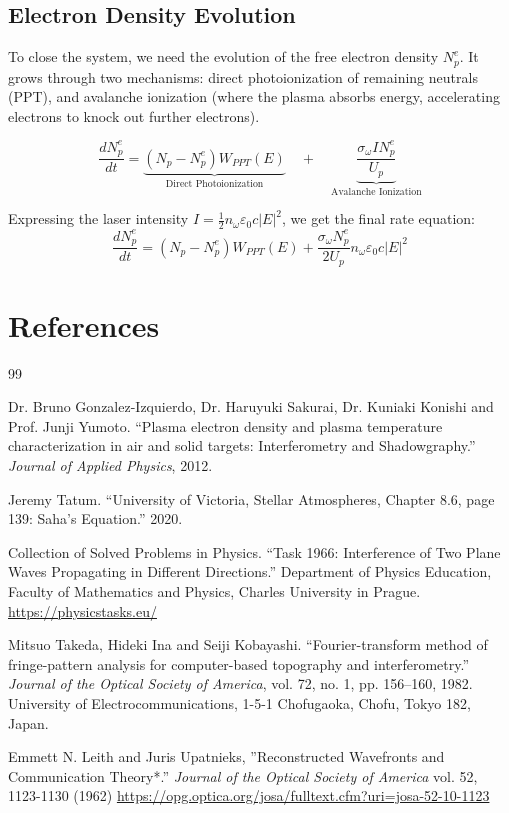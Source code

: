 \documentclass[11pt,a4paper]{article}
\begin{document}
\subsection*{Electron Density Evolution}
To close the system, we need the evolution of the free electron density $N_p^e$. It grows through two mechanisms: direct photoionization of remaining neutrals (PPT), and avalanche ionization (where the plasma absorbs energy, accelerating electrons to knock out further electrons).

\begin{equation}
\frac{d N_p^e}{dt} = \underbrace{(N_p - N_p^e) W_{PPT}(E)}_{\text{Direct Photoionization}} \quad + \quad \underbrace{\frac{\sigma_{\omega} I N_p^e}{U_p}}_{\text{Avalanche Ionization}}
\end{equation}

Expressing the laser intensity $I = \frac{1}{2} n_{\omega} \varepsilon_0 c |E|^2$, we get the final rate equation:
\begin{equation}
\frac{d N_p^e}{dt} = (N_p - N_p^e) W_{PPT}(E) + \frac{\sigma_{\omega} N_p^e}{2 U_p} n_{\omega} \varepsilon_0 c |E|^2
\end{equation}
\section{References}

\begin{thebibliography}{99}

Dr. Bruno Gonzalez-Izquierdo, Dr. Haruyuki Sakurai, Dr. Kuniaki Konishi and Prof. Junji Yumoto. 
``Plasma electron density and plasma temperature characterization in air and solid targets: Interferometry and Shadowgraphy.'' 
\textit{Journal of Applied Physics}, 2012.

Jeremy Tatum. 
``University of Victoria, Stellar Atmospheres, Chapter 8.6, page 139: Saha's Equation.''
2020.

Collection of Solved Problems in Physics. 
``Task 1966: Interference of Two Plane Waves Propagating in Different Directions.'' 
Department of Physics Education, Faculty of Mathematics and Physics, Charles University in Prague.
\newline
\url{https://physicstasks.eu/}

Mitsuo Takeda, Hideki Ina and Seiji Kobayashi. 
``Fourier-transform method of fringe-pattern analysis for computer-based topography and interferometry.'' 
\textit{Journal of the Optical Society of America}, vol. 72, no. 1, pp. 156--160, 1982.
\newline
University of Electrocommunications, 1-5-1 Chofugaoka, Chofu, Tokyo 182, Japan.

Emmett N. Leith and Juris Upatnieks, ''Reconstructed Wavefronts and Communication Theory*.'' 
\textit{Journal of the Optical Society of America} vol. 52, 1123-1130 (1962)
\url{https://opg.optica.org/josa/fulltext.cfm?uri=josa-52-10-1123}
\end{thebibliography}
\end{document}
